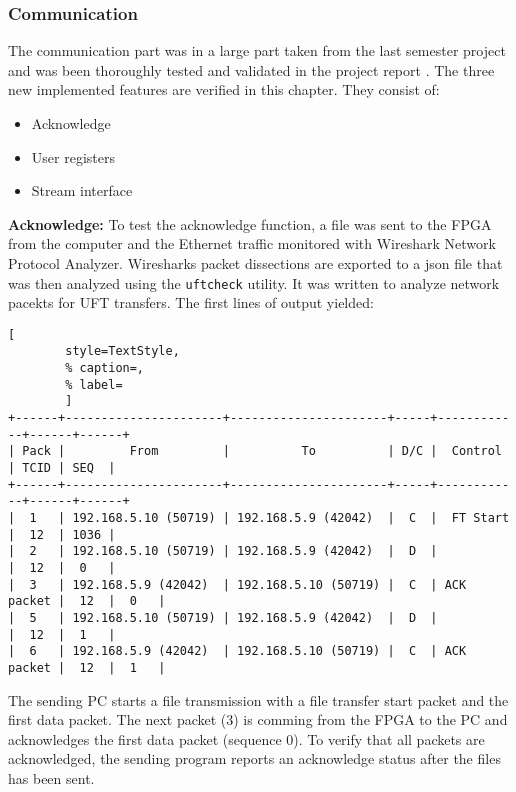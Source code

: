 \subsubsection*{Communication}
The communication part was in a large part taken from the last semester project
and was been thoroughly tested and validated in the project report 
\cite{p5report}. The three new implemented features are verified in this
chapter. They consist of:
\begin{itemize}
    \item Acknowledge
    \item User registers
    \item Stream interface
\end{itemize}

\vspace{1ex}
\textbf{Acknowledge:} To test the acknowledge function, a file was sent to the
FPGA from the computer
and the Ethernet traffic monitored with Wireshark Network Protocol Analyzer.
Wiresharks packet dissections are exported to a json file that was then analyzed
using the \texttt{uftcheck} utility. It was written to analyze network pacekts
for UFT transfers. The first lines of output yielded:

\vspace{1ex}
\begin{minipage}{1\linewidth}
    \begin{lstlisting}[
        style=TextStyle, 
        % caption=, 
        % label=
        ]
+------+----------------------+----------------------+-----+------------+------+------+
| Pack |         From         |          To          | D/C |  Control   | TCID | SEQ  | 
+------+----------------------+----------------------+-----+------------+------+------+
|  1   | 192.168.5.10 (50719) | 192.168.5.9 (42042)  |  C  |  FT Start  |  12  | 1036 |
|  2   | 192.168.5.10 (50719) | 192.168.5.9 (42042)  |  D  |            |  12  |  0   |
|  3   | 192.168.5.9 (42042)  | 192.168.5.10 (50719) |  C  | ACK packet |  12  |  0   |
|  5   | 192.168.5.10 (50719) | 192.168.5.9 (42042)  |  D  |            |  12  |  1   |
|  6   | 192.168.5.9 (42042)  | 192.168.5.10 (50719) |  C  | ACK packet |  12  |  1   |
\end{lstlisting}
\end{minipage}

\vspace{1ex}
The sending PC starts a file transmission with a file transfer start packet and
the first data packet. The next packet (3) is comming from the FPGA to the PC
and acknowledges the first data packet (sequence 0). To verify that all packets
are acknowledged, the sending program reports an acknowledge status after the
files has been sent. 

